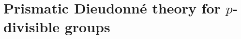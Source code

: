 \documentclass{amsart}
\newcommand{\prism}{{\mathlarger{\mathbbl{\Delta}}}}
\theoremstyle{plain}
\theoremstyle{definition}
\newcommand{\Z}{\mathbb{Z}}
\newcommand{\red}[1]{{\color{black} #1}}
\begin{document}



\newpage
\section{Prismatic Dieudonn\'e theory for $p$-divisible groups}
\label{sec:prism-dieu-theory-for-p-divisible-groups}
\end{document}
